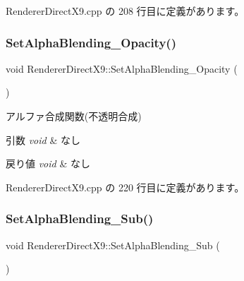  Renderer\+Direct\+X9.\+cpp の 208 行目に定義があります。

\mbox{\label{class_renderer_direct_x9_a789206ba211e9cbffe0bfe4c7dfb7457}} 
\subsubsection{\texorpdfstring{Set\+Alpha\+Blending\+\_\+\+Opacity()}{SetAlphaBlending\_Opacity()}}
{\footnotesize\ttfamily void Renderer\+Direct\+X9\+::\+Set\+Alpha\+Blending\+\_\+\+Opacity (\begin{DoxyParamCaption}{ }\end{DoxyParamCaption})}



アルファ合成関数(不透明合成) 


\begin{DoxyParams}{引数}
{\em void} & なし \\
\hline
\end{DoxyParams}

\begin{DoxyRetVals}{戻り値}
{\em void} & なし \\
\hline
\end{DoxyRetVals}


 Renderer\+Direct\+X9.\+cpp の 220 行目に定義があります。

\mbox{\label{class_renderer_direct_x9_a6ddbb9f801ef6b2c86ec5cd4e97b317b}} 
\subsubsection{\texorpdfstring{Set\+Alpha\+Blending\+\_\+\+Sub()}{SetAlphaBlending\_Sub()}}
{\footnotesize\ttfamily void Renderer\+Direct\+X9\+::\+Set\+Alpha\+Blending\+\_\+\+Sub (\begin{DoxyParamCaption}{ }\end{DoxyParamCaption})}



